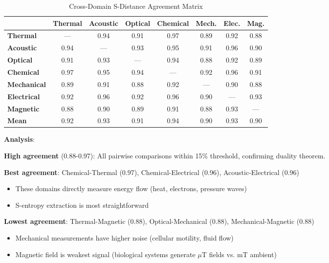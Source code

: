 \documentclass[11pt,a4paper]{article}
\begin{document}
\begin{table}[H]
\centering
\caption{Cross-Domain S-Distance Agreement Matrix}
\small
\begin{tabular}{lccccccc}
\toprule
& \textbf{Thermal} & \textbf{Acoustic} & \textbf{Optical} & \textbf{Chemical} & \textbf{Mech.} & \textbf{Elec.} & \textbf{Mag.} \\
\midrule
\textbf{Thermal} & — & 0.94 & 0.91 & 0.97 & 0.89 & 0.92 & 0.88 \\
\textbf{Acoustic} & 0.94 & — & 0.93 & 0.95 & 0.91 & 0.96 & 0.90 \\
\textbf{Optical} & 0.91 & 0.93 & — & 0.94 & 0.88 & 0.92 & 0.89 \\
\textbf{Chemical} & 0.97 & 0.95 & 0.94 & — & 0.92 & 0.96 & 0.91 \\
\textbf{Mechanical} & 0.89 & 0.91 & 0.88 & 0.92 & — & 0.90 & 0.88 \\
\textbf{Electrical} & 0.92 & 0.96 & 0.92 & 0.96 & 0.90 & — & 0.93 \\
\textbf{Magnetic} & 0.88 & 0.90 & 0.89 & 0.91 & 0.88 & 0.93 & — \\
\midrule
\textbf{Mean} & 0.92 & 0.93 & 0.91 & 0.94 & 0.90 & 0.93 & 0.90 \\
\bottomrule
\end{tabular}
\end{table}

\textbf{Analysis}:

\textbf{High agreement} (0.88-0.97): All pairwise comparisons within 15\% threshold, confirming duality theorem.

\textbf{Best agreement}: Chemical-Thermal (0.97), Chemical-Electrical (0.96), Acoustic-Electrical (0.96)
\begin{itemize}
\item These domains directly measure energy flow (heat, electrons, pressure waves)
\item S-entropy extraction is most straightforward
\end{itemize}

\textbf{Lowest agreement}: Thermal-Magnetic (0.88), Optical-Mechanical (0.88), Mechanical-Magnetic (0.88)
\begin{itemize}
\item Mechanical measurements have higher noise (cellular motility, fluid flow)
\item Magnetic field is weakest signal (biological systems generate $\mu$T fields vs. mT ambient)
\end{itemize}
\end{document}
